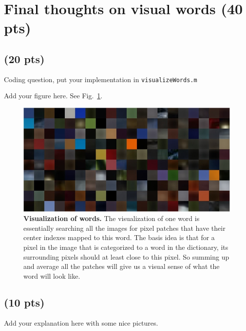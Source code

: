 \documentclass[12pt]{article}
\newcounter{list}
\begin{document}
\section{Final thoughts on visual words (40 pts)}

\subsection{(20 pts)}

Coding question, put your implementation in \verb+visualizeWords.m+




Add your figure here. See Fig.~\ref{fig:visual_words}.

\begin{figure}[ht!]
  \centering \includegraphics[width=0.8\linewidth]{./figures/visualwords}
  \caption{{\bf Visualization of words.} The visualization of one word is essentially searching all the images for pixel patches that have their center indexes mapped to this word. The basis idea is that for a pixel in the image that is categorized to a word in the dictionary, its surrounding pixels should at least close to this pixel. So summing up and average all the patches will give us a visual sense of what the word will look like.}
\label{fig:visual_words}
\end{figure}

\subsection{(10 pts)}

Add your explanation here with some nice pictures.
\end{document}
